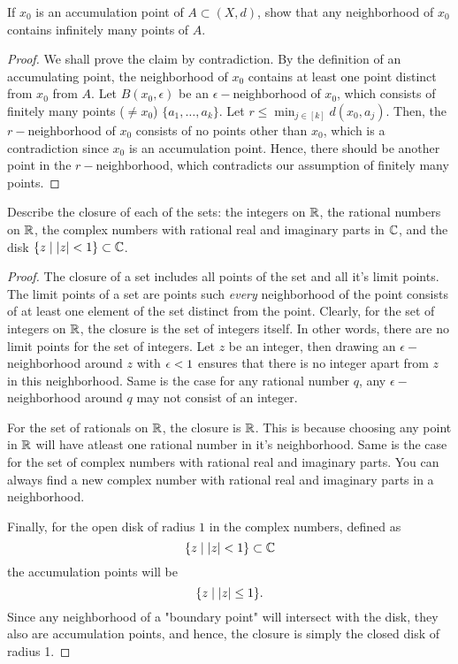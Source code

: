 \begin{question}
    If $x_0$ is an accumulation point of $A \subset (X,d)$, show that any neighborhood of $x_0$ contains infinitely many points of $A$.
    \label{section1.3-6}
\end{question}
\begin{proof}
     We shall prove the claim by contradiction. By the definition of an accumulating point, the neighborhood of $x_0$ contains at least one point distinct from $x_0$ from $A$. Let $B(x_0 , \epsilon)$ be an $\epsilon-$neighborhood of $x_0$, which consists of finitely many points ($\neq x_0$)  $\{a_1 , \ldots ,a_k\}$. Let $r \leq \min_{j \in [k]} d(x_0 , a_j)$. Then, the $r-$neighborhood of $x_0$ consists of no points other than $x_0$, which is a contradiction since $x_0$ is an accumulation point. Hence, there should be another point in the $r-$neighborhood, which contradicts our assumption of finitely many points.
\end{proof}

\begin{question}
    Describe the closure of each of the sets: the integers on $\mathbb{R}$, the rational numbers on $\mathbb{R}$, the complex numbers with rational real and imaginary parts in $\mathbb{C}$, and the disk $\{z \mid \left\lvert z \right\rvert < 1\} \subset \mathbb{C}$.
\end{question}
\begin{proof}
    The closure of a set includes all points of the set and all it's limit points. The limit points of a set are points such \emph{every} neighborhood of the point consists of at least one element of the set distinct from the point. Clearly, for the set of integers on $\mathbb{R}$, the closure is the set of integers itself. In other words, there are no limit points for the set of integers. Let $z$ be an integer, then drawing an $\epsilon-$neighborhood around $z$ with $\epsilon < 1$ ensures that there is no integer apart from $z$ in this neighborhood. Same is the case for any rational number $q$, any $\epsilon-$neighborhood around $q$ may not consist of an integer.

    For the set of rationals on $\mathbb{R}$, the closure is $\mathbb{R}$. This is because choosing any point in $\mathbb{R}$ will have atleast one rational number in it's neighborhood. Same is the case for the set of complex numbers with rational real and imaginary parts. You can always find a new complex number with rational real and imaginary parts in a neighborhood. 

    Finally, for the open disk of radius $1$ in the complex numbers, defined as
    \[\{z \mid \left\lvert z \right\rvert < 1\} \subset \mathbb{C}\]
    the accumulation points will be 
     \[\{z \mid \left\lvert z \right\rvert \leq 1\}.\]
     Since any neighborhood of a "boundary point" will intersect with the disk, they also are accumulation points, and hence, the closure is simply the closed disk of radius 1.
\end{proof}

